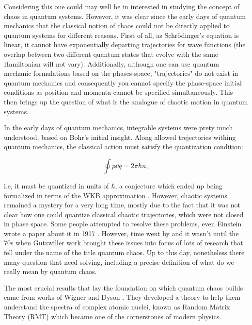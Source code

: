 \documentclass[11pt,a4paper]{article}
\begin{document}
Considering this one could may well be in interested in studying the concept of chaos in quantum systems. However, it was clear since the early days of quantum mechanics that the classical notion of chaos could not be directly applied to quantum systems for different reasons. First of all, as Schrödinger's equation is linear, it cannot have exponentially departing trajectories for wave functions (the overlap between two different quantum states that evolve with the same Hamiltonian will not vary). Additionally, although one can use quantum mechanic formulations based on the phases-space, "trajectories" do not exist in quantum mechanics and consequently you cannot specify the phase-space initial conditions as position and momenta cannot be specified simultaneously. This then brings up the question of what is the analogue of chaotic motion in quantum systems.

In the early days of quantum mechanics, integrable systems were prety much understood, based on Bohr's initial insight. Along allowed trejectories withing quantum mechanics, the classical action must satisfy the quantization condition:

\begin{equation}
    \oint p\dd q =2\pi\hbar n,
\end{equation}

i.e, it must be quantized in units of $\hbar$, a conjecture which ended up being formalized in terms of the WKB approximation \cite{wentzel_verallgemeinerung_1926,kramers_wellenmechanik_1926,Brillouin:1926blg}. However, chaotic systems remained a mystery for a very long time, mostly due to the fact that it was not clear how one could quantize classical chaotic trajectories, which were not closed in phase space. Some people attempted to resolve these problems, even Einstein wrote a paper about it in 1917 \cite{stone_einsteins_2005}. However, time went by and it wasn't until the 70s when Gutzwiller work \cite{gutzwiller_periodic_1971} brought these issues into focus of lots of research that fell under the name of the title quantum chaos. Up to this day, nonetheless there many question that need solving, including a precise definition of what do we really mean by quantum chaos.

The most crucial results that lay the foundation on which quantum chaos builds came from works of Wigner and Dyson \cite{wigner_characteristic_1955,wigner_characteristics_1957,wigner_distribution_1958,dyson_statistical_1962}. They developed a theory to help them understand the spectra of complex atomic nuclei, known as Random Matrix Theory (RMT) which became one of the cornerstones of modern physics. 
\end{document}
